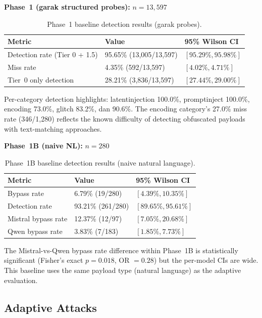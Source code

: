 \documentclass[11pt]{article}
\begin{document}
\textbf{Phase~1 (garak structured probes):} \(n = 13{,}597\)

\begin{table}[htbp]
\centering
\caption{Phase~1 baseline detection results (garak probes).}
\label{tab:phase1}
\begin{tabular}{@{}lll@{}}
\toprule
\textbf{Metric} & \textbf{Value} & \textbf{95\% Wilson CI} \\
\midrule
Detection rate (Tier 0 + 1.5) & 95.65\% (13{,}005/13{,}597) & \([95.29\%, 95.98\%]\) \\
Miss rate & 4.35\% (592/13{,}597) & \([4.02\%, 4.71\%]\) \\
Tier~0 only detection & 28.21\% (3{,}836/13{,}597) & \([27.44\%, 29.00\%]\) \\
\bottomrule
\end{tabular}
\end{table}

Per-category detection highlights: latentinjection 100.0\%, promptinject 100.0\%, encoding 73.0\%, glitch 83.2\%, dan 90.6\%. The encoding category's 27.0\% miss rate (346/1{,}280) reflects the known difficulty of detecting obfuscated payloads with text-matching approaches.

\medskip
\noindent\textbf{Phase~1B (naive NL):} \(n = 280\)

\begin{table}[htbp]
\centering
\caption{Phase~1B baseline detection results (naive natural language).}
\label{tab:phase1b}
\begin{tabular}{@{}lll@{}}
\toprule
\textbf{Metric} & \textbf{Value} & \textbf{95\% Wilson CI} \\
\midrule
Bypass rate & 6.79\% (19/280) & \([4.39\%, 10.35\%]\) \\
Detection rate & 93.21\% (261/280) & \([89.65\%, 95.61\%]\) \\
Mistral bypass rate & 12.37\% (12/97) & \([7.05\%, 20.68\%]\) \\
Qwen bypass rate & 3.83\% (7/183) & \([1.85\%, 7.73\%]\) \\
\bottomrule
\end{tabular}
\end{table}

The Mistral-vs-Qwen bypass rate difference within Phase~1B is statistically significant (Fisher's exact \(p = 0.018\), OR \(= 0.28\)) but the per-model CIs are wide. This baseline uses the same payload type (natural language) as the adaptive evaluation.

\subsection{Adaptive Attacks}
\end{document}
